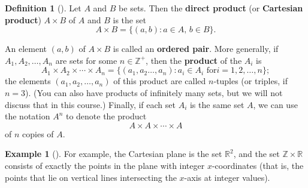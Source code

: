 \documentclass[10pt,openany,oneside]{book}
\newcommand{\terminology}[1]{\textbf{#1}}
\theoremstyle{plain}
\theoremstyle{definition}
\newtheorem{definition}[theorem]{Definition}
\theoremstyle{definition}
\theoremstyle{definition}
\newtheorem{example}[theorem]{Example}
\theoremstyle{definition}
\numberwithin{equation}{section}
\def\Z{\mathbb{Z}}
\def\R{\mathbb{R}}
\begin{document}
\begin{definition}[{}]\label{definition-7}
\label{notation-22}
Let \(A\) and \(B\) be sets. Then the \terminology{direct product} (or \terminology{Cartesian product}) \(A\times B\) of \(A\) and \(B\) is the set%
\begin{equation*}
A\times B =\{(a,b): \text{\(a\in A\), \(b\in B\)} \}.
\end{equation*}
%
\par
An element \((a,b)\) of \(A\times B\) is called an \terminology{ordered pair}. More generally, if \(A_1, A_2, \ldots, A_n\) are sets for some \(n\in \Z^+\), then the \terminology{product} of the \(A_i\) is%
\begin{equation*}
A_1\times A_2 \times \cdots \times A_n=\{(a_1, a_2 \ldots, a_n): a_i \in A_i \text{ for
} i=1,2, \ldots, n\};
\end{equation*}
the elements \((a_1,a_2,\ldots,a_n)\) of this product are called \(n\)-tuples (or triples, if \(n=3\)). (You can also have products of infinitely many sets, but we will not discuss that in this course.) Finally, if each set \(A_i\) is the same set \(A\), we can use the notation \(A^n\) to denote the product%
\begin{equation*}
A\times A \times \cdots \times A
\end{equation*}
of \(n\) copies of \(A\).%
\end{definition}
\begin{example}[]\label{example-4}
For example, the Cartesian plane is the set \(\R^2\), and the set \(\Z \times \R\) consists of exactly the points in the plane with integer \(x\)-coordinates (that is, the points that lie on vertical lines intersecting the \(x\)-axis at integer values).%
\end{example}
\typeout{************************************************}
\typeout{************************************************}
\end{document}
